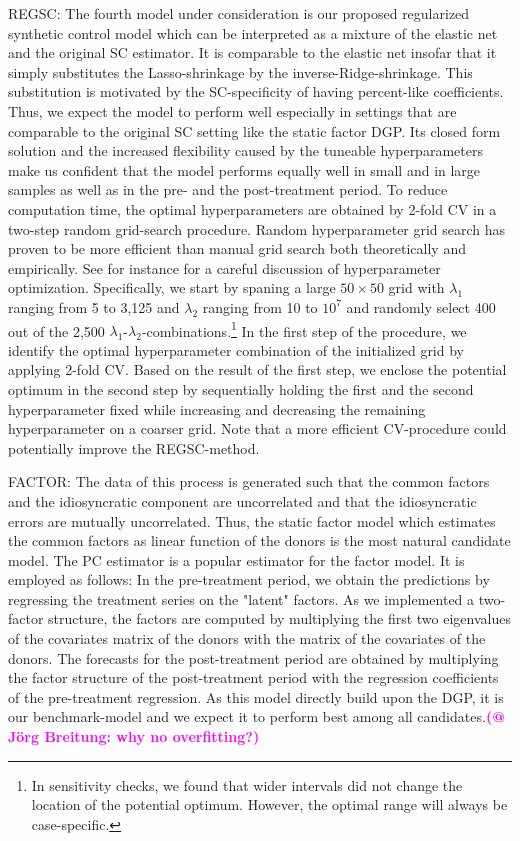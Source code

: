 REGSC: The fourth model under consideration is our proposed regularized synthetic control model which can be interpreted as a mixture of the elastic net and the original \ac{SC} estimator. It is comparable to the elastic net insofar that it simply substitutes the Lasso-shrinkage by the inverse-Ridge-shrinkage. This substitution is motivated by the \ac{SC}-specificity of having percent-like coefficients. Thus, we expect the model to perform well especially in settings that are comparable to the original \ac{SC} setting like the static factor \ac{DGP}. Its closed form solution and the increased flexibility caused by the tuneable hyperparameters make us confident that the model performs equally well in small and in large samples as well as in the pre- and the post-treatment period. To reduce computation time, the optimal hyperparameters are obtained by 2-fold \ac{CV} in a two-step random grid-search procedure. Random hyperparameter grid search has proven to be more efficient than manual grid search both theoretically and empirically. See for instance \cite{bergstra:2012} for a careful discussion of hyperparameter optimization. Specifically, we start by spaning a large $50 \times 50$ grid with $\lambda_1$ ranging from 5 to 3,125 and $\lambda_2$ ranging from 10 to $10^7$ and randomly select 400 out of the 2,500 $\lambda_1$-$\lambda_2$-combinations.\footnote{In sensitivity checks, we found that wider intervals did not change the location of the potential optimum. However, the optimal range will always be case-specific.} In the first step of the procedure, we identify the optimal hyperparameter combination of the initialized grid by applying 2-fold \ac{CV}. Based on the result of the first step, we enclose the potential optimum in the second step by sequentially holding the first and the second hyperparameter fixed while increasing and decreasing the remaining hyperparameter on a coarser grid. Note that a more efficient \ac{CV}-procedure could potentially improve the \ac{REGSC}-method.

FACTOR: The data of this process is generated such that the common factors and the idiosyncratic component are uncorrelated and that the idiosyncratic errors are mutually uncorrelated. Thus, the static factor model which estimates the common factors as linear function of the donors is the most natural candidate model. The \ac{PC} estimator is a popular estimator for the factor model. It is employed as follows: In the pre-treatment period, we obtain the predictions by regressing the treatment series on the "latent" factors. As we implemented a two-factor structure, the factors are computed by multiplying the first two eigenvalues of the covariates matrix of the donors with the matrix of the covariates of the donors. The forecasts for the post-treatment period are obtained by multiplying the factor structure of the post-treatment period with the regression coefficients of the pre-treatment regression. As this model directly build upon the \ac{DGP}, it is our benchmark-model and we expect it to perform best among all candidates.\textcolor{magenta}{\textbf{(@ Jörg Breitung: why no overfitting?)}} 

